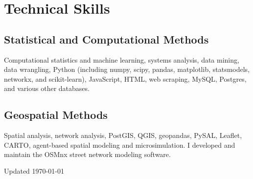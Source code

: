 \documentclass[12pt,letterpaper]{report}
\newcommand{\listitemspace}{0.15em}
\renewenvironment{itemize}
{\begin{list}{}{\setlength{\leftmargin}{0em}
            \setlength{\parskip}{0em}
            \setlength{\itemsep}{\listitemspace}
            \setlength{\parsep}{\listitemspace}}}
    {\end{list}}
\begin{document}
    \section*{Technical Skills}

    \subsection*{Statistical and Computational Methods}

    \begin{itemize}

        \item Computational statistics and machine learning, systems analysis, data mining, data wrangling, Python (including numpy, scipy, pandas, matplotlib, statsmodels, networkx, and scikit-learn), JavaScript, HTML, web scraping, MySQL, Postgres, and various other databases.

    \end{itemize}

    \subsection*{Geospatial Methods}

    \begin{itemize}

        \item Spatial analysis, network analysis, PostGIS, QGIS, geopandas, PySAL, Leaflet, CARTO, agent-based spatial modeling and microsimulation. I developed and maintain the OSMnx street network modeling software.

    \end{itemize}



    \begin{center}
        \vfill
        Updated \monthyeardate\today
    \end{center}
\end{document}
